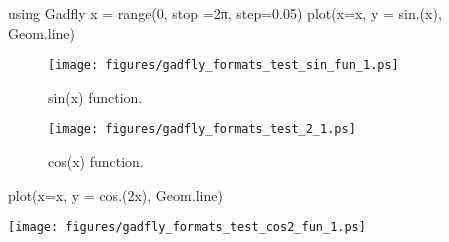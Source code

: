 
\begin{juliacode}
using Gadfly
x = range(0, stop =2π, step=0.05)
plot(x=x, y = sin.(x), Geom.line)
\end{juliacode}
\begin{figure}[ht]
\center
\texttt{[image: figures/gadfly\_formats\_test\_sin\_fun\_1.ps]}
\caption{sin(x) function.}
\label{fig:sin_fun}
\end{figure}

\begin{figure}[htpb]
\center
\texttt{[image: figures/gadfly\_formats\_test\_2\_1.ps]}
\caption{cos(x) function.}
\end{figure}

\begin{juliacode}
plot(x=x, y = cos.(2x), Geom.line)
\end{juliacode}
\texttt{[image: figures/gadfly\_formats\_test\_cos2\_fun\_1.ps]}
